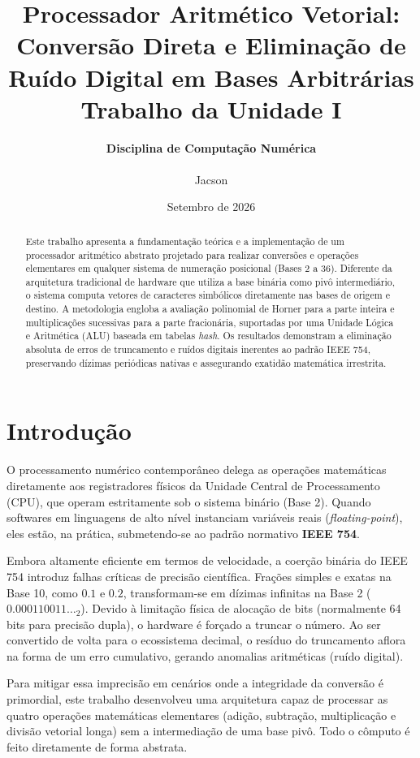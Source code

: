 \documentclass[12pt,a4paper]{article}
\title{
\vspace{-2em}
\textbf{Processador Aritmético Vetorial: Conversão Direta e Eliminação de Ruído Digital em Bases Arbitrárias}
\vspace{0.5em} \\
\large Trabalho da Unidade I}
\author{
\textbf{Disciplina de Computação Numérica}\\
\vspace{0.5em} \\ 
Jacson \\
}
\date{Setembro de 2026}
\begin{document}
\maketitle

\begin{abstract}
Este trabalho apresenta a fundamentação teórica e a implementação de um processador aritmético abstrato projetado para realizar conversões e operações elementares em qualquer sistema de numeração posicional (Bases 2 a 36). Diferente da arquitetura tradicional de hardware que utiliza a base binária como pivô intermediário, o sistema computa vetores de caracteres simbólicos diretamente nas bases de origem e destino. A metodologia engloba a avaliação polinomial de Horner para a parte inteira e multiplicações sucessivas para a parte fracionária, suportadas por uma Unidade Lógica e Aritmética (ALU) baseada em tabelas \textit{hash}. Os resultados demonstram a eliminação absoluta de erros de truncamento e ruídos digitais inerentes ao padrão IEEE 754, preservando dízimas periódicas nativas e assegurando exatidão matemática irrestrita.
\end{abstract}

\section{Introdução}
O processamento numérico contemporâneo delega as operações matemáticas diretamente aos registradores físicos da Unidade Central de Processamento (CPU), que operam estritamente sob o sistema binário (Base 2). Quando softwares em linguagens de alto nível instanciam variáveis reais (\textit{floating-point}), eles estão, na prática, submetendo-se ao padrão normativo \textbf{IEEE 754}.

Embora altamente eficiente em termos de velocidade, a coerção binária do IEEE 754 introduz falhas críticas de precisão científica. Frações simples e exatas na Base 10, como $0.1$ e $0.2$, transformam-se em dízimas infinitas na Base 2 ($0.000110011\dots_2$). Devido à limitação física de alocação de bits (normalmente 64 bits para precisão dupla), o hardware é forçado a truncar o número. Ao ser convertido de volta para o ecossistema decimal, o resíduo do truncamento aflora na forma de um erro cumulativo, gerando anomalias aritméticas (ruído digital).

Para mitigar essa imprecisão em cenários onde a integridade da conversão é primordial, este trabalho desenvolveu uma arquitetura capaz de processar as quatro operações matemáticas elementares (adição, subtração, multiplicação e divisão vetorial longa) sem a intermediação de uma base pivô. Todo o cômputo é feito diretamente de forma abstrata.
\end{document}

